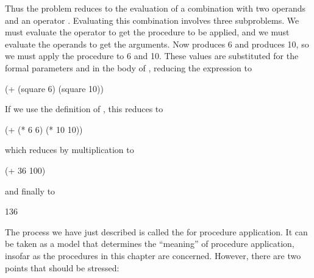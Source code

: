 \noindent
Thus the problem reduces to the evaluation of a combination with two operands
and an operator .  Evaluating this combination involves
three subproblems.  We must evaluate the operator to get the procedure to be
applied, and we must evaluate the operands to get the arguments.  Now  produces 6 and  produces 10, so we must apply the
 procedure to 6 and 10.  These values are substituted for
the formal parameters  and  in the body of
, reducing the expression to

\begin{codeBlock}
(+ (square 6) (square 10))
\end{codeBlock}

\noindent
If we use the definition of , this reduces to

\begin{codeBlock}
(+ (* 6 6) (* 10 10))
\end{codeBlock}

\noindent
which reduces by multiplication to

\begin{codeBlock}
(+ 36 100)
\end{codeBlock}

\noindent
and finally to

\begin{codeBlock}
136
\end{codeBlock}

\noindent
The process we have just described is called the 
for procedure application.  It can be taken as a model that determines the
``meaning'' of procedure application, insofar as the procedures in this chapter
are concerned.  However, there are two points that should be stressed:

